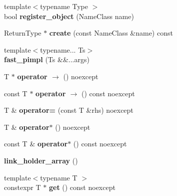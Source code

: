 \begin{CompactItemize}
\item 
\hypertarget{classhope_1_1final_f7035852a144dcc1bb3b5cf8cd52707b}{
{\footnotesize template$<$typename Type $>$ }\\bool \textbf{register\_\-object} (NameClass name)}
\label{classhope_1_1final_f7035852a144dcc1bb3b5cf8cd52707b}

\item 
\hypertarget{classhope_1_1final_032105ac5bedbf8b4b6cf2ba9d95966e}{
ReturnType $\ast$ \textbf{create} (const NameClass \&name) const }
\label{classhope_1_1final_032105ac5bedbf8b4b6cf2ba9d95966e}

\item 
\hypertarget{classhope_1_1final_56edd0c19d9298493ad5029abf87ba56}{
{\footnotesize template$<$typename... Ts$>$ }\\\textbf{fast\_\-pimpl} (Ts \&\&...args)}
\label{classhope_1_1final_56edd0c19d9298493ad5029abf87ba56}

\item 
\hypertarget{classhope_1_1final_cc44bc2eea7e247cf2d7bcb57f7649d7}{
T $\ast$ \textbf{operator $\rightarrow$ } () noexcept}
\label{classhope_1_1final_cc44bc2eea7e247cf2d7bcb57f7649d7}

\item 
\hypertarget{classhope_1_1final_71cd9a35eadcbae6440af54ae9213a34}{
const T $\ast$ \textbf{operator $\rightarrow$ } () const noexcept}
\label{classhope_1_1final_71cd9a35eadcbae6440af54ae9213a34}

\item 
\hypertarget{classhope_1_1final_b2f4e4e314182e3b906065cde61af2f5}{
T \& \textbf{operator=} (const T \&rhs) noexcept}
\label{classhope_1_1final_b2f4e4e314182e3b906065cde61af2f5}

\item 
\hypertarget{classhope_1_1final_e91c6193d80043db1a43bd9e98845873}{
T \& \textbf{operator$\ast$} () noexcept}
\label{classhope_1_1final_e91c6193d80043db1a43bd9e98845873}

\item 
\hypertarget{classhope_1_1final_69f5ec2a89be50ffb59b53484b098acd}{
const T \& \textbf{operator$\ast$} () const noexcept}
\label{classhope_1_1final_69f5ec2a89be50ffb59b53484b098acd}

\item 
\hypertarget{classhope_1_1final_bc99257f2062074fff841ff29afaaba0}{
\textbf{link\_\-holder\_\-array} ()}
\label{classhope_1_1final_bc99257f2062074fff841ff29afaaba0}

\item 
\hypertarget{classhope_1_1final_cc0466258e5dbbd500292d18124bed63}{
{\footnotesize template$<$typename T $>$ }\\constexpr T $\ast$ \textbf{get} () const noexcept}
\label{classhope_1_1final_cc0466258e5dbbd500292d18124bed63}


\end{CompactItemize}
